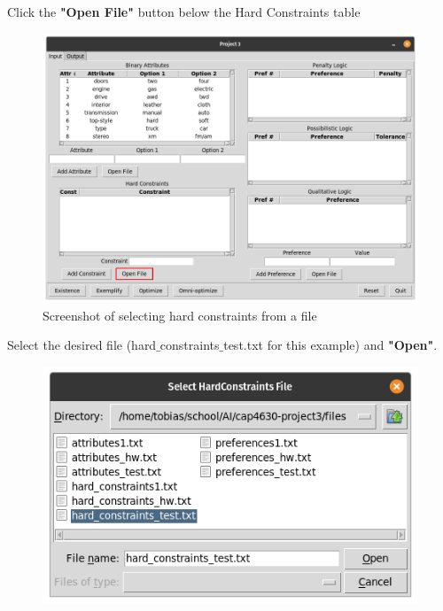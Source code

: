 \documentclass[12pt]{report}
\begin{document}
\begin{description}[leftmargin=4em]
\item [Step 1:] Click the \textbf{"Open File"} button below the Hard Constraints table
\begin{figure}[H]
\begin{center}
\includegraphics[scale=0.275,trim=1cm 1cm 1cm 1cm]{input_constraints}
\caption{Screenshot of selecting hard constraints from a file}
\end{center}
\end{figure}
\vspace{-2.5em}
\item [Step 2:] Select the desired file (hard$\_$constraints$\_$test.txt for this example) and \textbf{"Open"}.
\begin{figure}[H]
\begin{center}
\includegraphics[scale=0.3,trim=1cm 1cm 1cm 1cm]{select_constraints}

\end{center}
\end{figure}
\end{description}
\end{document}
